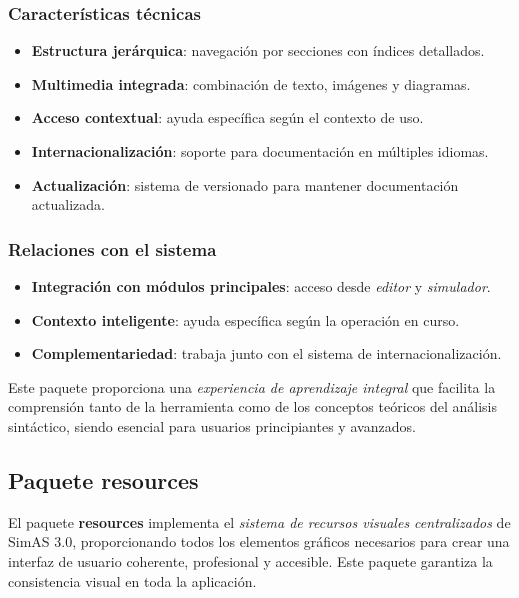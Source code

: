 \subsubsection{Características técnicas}

\begin{itemize}
    \item \textbf{Estructura jerárquica}: navegación por secciones con índices detallados.
    \item \textbf{Multimedia integrada}: combinación de texto, imágenes y diagramas.
    \item \textbf{Acceso contextual}: ayuda específica según el contexto de uso.
    \item \textbf{Internacionalización}: soporte para documentación en múltiples idiomas.
    \item \textbf{Actualización}: sistema de versionado para mantener documentación actualizada.
\end{itemize}

\subsubsection{Relaciones con el sistema}

\begin{itemize}
    \item \textbf{Integración con módulos principales}: acceso desde \textit{editor} y \textit{simulador}.
    \item \textbf{Contexto inteligente}: ayuda específica según la operación en curso.
    \item \textbf{Complementariedad}: trabaja junto con el sistema de internacionalización.
\end{itemize}

Este paquete proporciona una \textit{experiencia de aprendizaje integral} que facilita la comprensión tanto de la herramienta como de los conceptos teóricos del análisis sintáctico, siendo esencial para usuarios principiantes y avanzados.

\subsection{Paquete resources}

El paquete \textbf{resources} implementa el \textit{sistema de recursos visuales centralizados} de SimAS 3.0, proporcionando todos los elementos gráficos necesarios para crear una interfaz de usuario coherente, profesional y accesible. Este paquete garantiza la consistencia visual en toda la aplicación.

